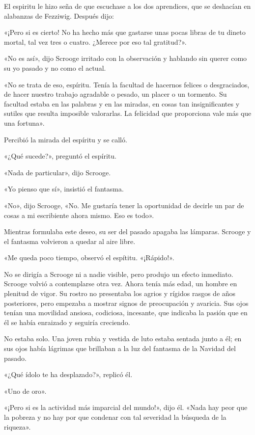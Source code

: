 \documentclass{novela}
\begin{document}
 El espiritu le hizo seña de que escuchase a los dos aprendices, que se deshacían en alabanzas de Fezziwig. Después dijo:

 «¡Pero si es cierto! No ha hecho más que gastarse unas pocas libras de tu dineto mortal, tal vez tres o cuatro. ¿Merece por eso tal gratitud?».

 «No es así», dijo Scrooge irritado con la observación y hablando sin querer como su yo pasado y no como el actual.

 «No se trata de eso, espíritu. Tenía la facultad de hacernos felices o desgraciados, de hacer nuestro trabajo agradable o pesado, un placer o un tormento. Su facultad estaba en las palabras y en las miradas, en cosas tan insignificantes y sutiles que resulta imposible valorarlas. La felicidad que proporciona vale más que una fortuna».

 Percibió la mirada del espíritu y se calló.

 «¿Qué sucede?», preguntó el espíritu.

 «Nada de particular», dijo Scrooge.

 «Yo pienso que sí», insistió el fantasma.

 «No», dijo Scrooge, «No. Me gustaría tener la oportunidad de decirle un par de cosas a mi escribiente ahora mismo. Eso es todo».

 Mientras formulaba este deseo, su ser del pasado apagaba las lámparas. Scrooge y el fantasma volvieron a quedar al aire libre.

 «Me queda poco tiempo, observó el espítitu. «¡Rápido!».

 No se dirigía a Scrooge ni a nadie visible, pero produjo un efecto inmediato. Scrooge volvió a contemplarse otra vez. Ahora tenía más edad, un hombre en plenitud de vigor. Su rostro no presentaba los agrios y rígidos rasgos de años posteriores, pero empezaba a mostrar signos de preocupación y avaricia. Sus ojos tenían una movilidad ansiosa, codiciosa, incesante, que indicaba la pasión que en él se había enraizado y seguiría creciendo.

 No estaba solo. Una joven rubia y vestida de luto estaba sentada junto a él; en sus ojos había lágrimas que brillaban a la luz del fantasma de la Navidad del pasado.

 «¿Qué ídolo te ha desplazado?», replicó él.

 «Uno de oro».

 «¡Pero si es la actividad más imparcial del mundo!», dijo él. «Nada hay peor que la pobreza y no hay por que condenar con tal severidad la búsqueda de la riqueza».
\end{document}
